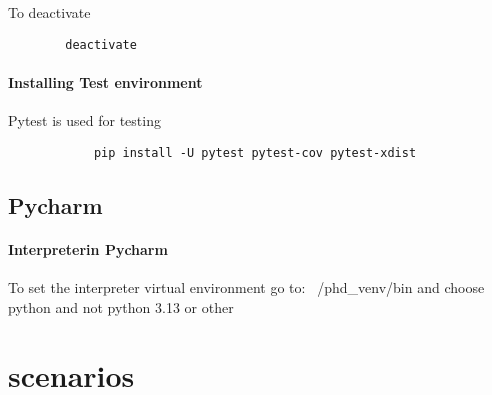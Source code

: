     To deactivate
    \begin{verbatim}
        deactivate
    \end{verbatim}
    
    
    
    \paragraph{Installing Test environment}
        Pytest is used for testing
        \begin{verbatim}
            pip install -U pytest pytest-cov pytest-xdist
        \end{verbatim}
    
    
    
    
    \subsection{Pycharm}
        \paragraph{Interpreterin Pycharm} To set the interpreter virtual environment go to: \texttt{~}/phd\_venv/bin and choose python and not python 3.13 or other


\section{scenarios}
